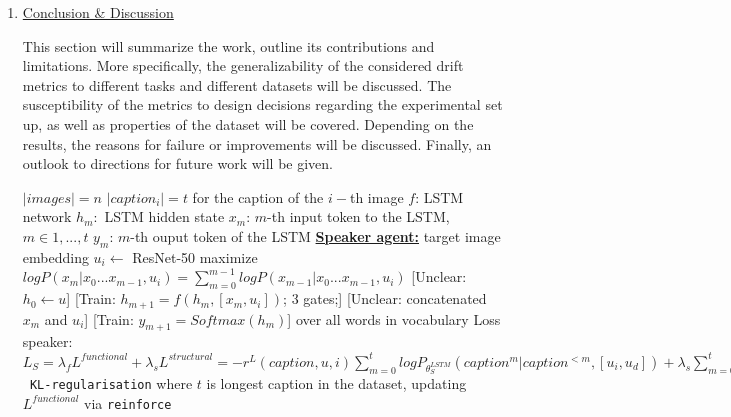 \documentclass[11pt,letterpaper]{article}
\newcommand{\train}[1]{\textcolor{BurntOrange}{[Train: #1]}}
\newcommand{\unclear}[1]{\textcolor{Cerulean}{[Unclear: #1]}}
\newcommand{\timing}[1]{\textcolor{ForestGreen}{[Time: #1]}}
\begin{document}
\begin{enumerate}
\begin{enumerate}
	 \item Based on this idea, \timing{a different approach to training could be considered,} whereby an image could be generated from the ground truth caption as an intermediate representation (cf. \cite{lee2019countering}). \unclear{Specifics of the architecture would have to be determined, provided the availability of a text-to-image model.}  
\end{enumerate}
If feasible, all these approaches could be tested in similar way as the exisiting metrics (i.e., during training and on the test split), and compared with respect to their accuracy and functional adequacy by manual inspection of caption samples. 

\item \underline{Conclusion \& Discussion}

This section will summarize the work, outline its contributions and limitations. More specifically, the generalizability of the considered drift metrics to different tasks and different datasets will be discussed. The susceptibility of the metrics to design decisions regarding the experimental set up, as well as properties of the dataset will be covered. Depending on the results, the reasons for failure or improvements will be discussed. Finally, an outlook to directions for future work will be given.

\begin{algorithm}[h]
	\caption{Basic reference game set up}
	\label{ref-game-alg}
	\begin{algorithmic}
		\State $|images| = n$
		\State $|caption_i| = t $ for the caption of the $i-$th image
		\State $f$: LSTM network		
		\State $h_m:  $ LSTM hidden state
		\State $x_m$: $m$-th input token to the LSTM, $m \in {1,...,t }$
		\State $y_m$: $m$-th ouput token of the LSTM 
			\State \underline{\textbf{Speaker agent:}}
				\State target image embedding $u_i \gets $ ResNet-50 
					\State maximize $log P(x_m | x_0...x_{m-1}, u_i) = \sum_{m=0}^{m-1} log P(x_{m-1}|x_0...x_{m-1}, u_i)$
					\State \unclear{$h_0 \gets u$}
					\State \train{$h_{m+1} = f(h_m, [x_m, u_i])$; 3 gates;} \unclear{concatenated $x_m$ and $u_i$}
					\State \train{$y_{m+1} = Softmax(h_m)$} over all words in vocabulary 
				\EndFor	
				\EndWhile
				\State Loss speaker: \\ $L_S= \lambda_fL^{functional} + \lambda_s L^{structural} = -r^L(caption, u, i)\sum_{m=0}^{t}log P_{\theta_S^{LSTM}}(caption^m|caption^{<m}, [u_i, u_d]) + \lambda_s \sum_{m=0}^{t}log P_{\theta_S^{LSTM}}(caption^m|caption^{<m}, u_i) +$\texttt{ KL-regularisation} where $t$ is longest caption in the dataset, updating $L^{functional}$ via \texttt{reinforce}\\
				

\end{algorithmic}
\end{algorithm}
\end{enumerate}
\end{document}
